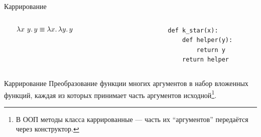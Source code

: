 \begin{frame}[fragile]{Каррирование}
\begin{columns}[onlytextwidth]
\begin{column}[t]{0.485\textwidth}
                \vspace{0.5em}
                \[\lambda x~y\ldotp y \equiv \lambda x\ldotp \lambda y\ldotp y\]
            \end{column}\hfill
            \begin{column}[t]{0.485\textwidth}
                \begin{verbatim}
                    def k_star(x):
                        def helper(y):
                            return y
                        return helper
                \end{verbatim}
            \end{column}
        \end{columns}
        \pause
        \vspace{-0.5em}
        \begin{block}{Каррирование}
            Преобразование функции многих аргументов в набор вложенных функций, каждая из которых принимает часть аргументов исходной\footnote{В ООП методы класса каррированные --- часть их ``аргументов'' передаётся через конструктор.}.
        \end{block}
    \end{frame}

